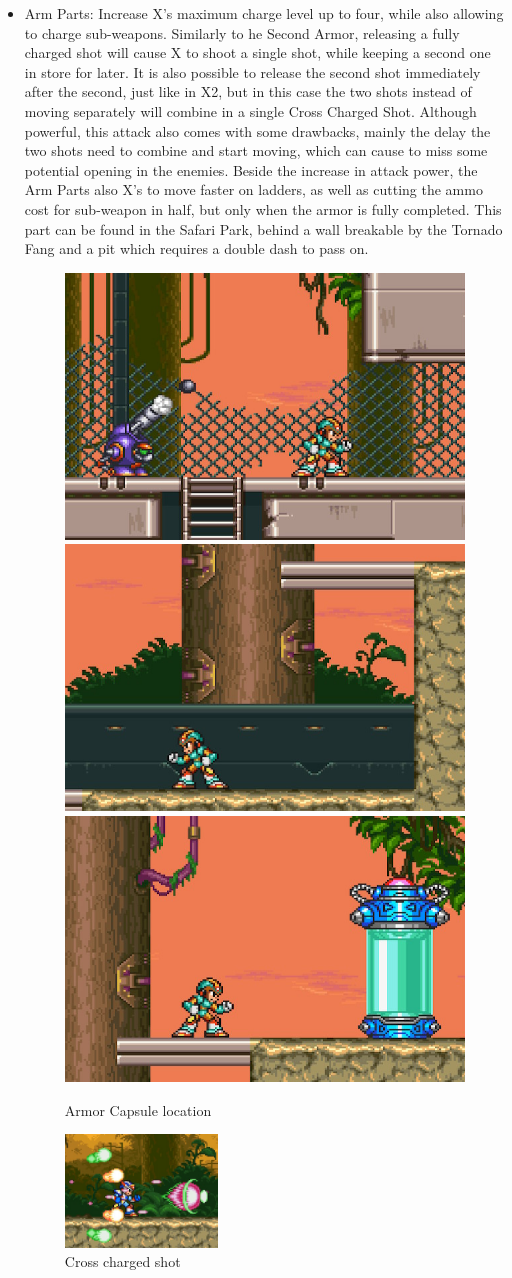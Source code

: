 \begin{itemize}
	\item Arm Parts: Increase X's maximum charge level up to four, while also allowing to charge sub-weapons. Similarly to he Second Armor, releasing a fully charged shot will cause X to shoot a single shot, while keeping a second one in store for later. It is also possible to release the second shot immediately after the second, just like in X2, but in this case the two shots instead of moving separately will combine in a single Cross Charged Shot. Although powerful, this attack also comes with some drawbacks, mainly the delay the two shots need to combine and start moving, which can cause to miss some potential opening in the enemies. 
	Beside the increase in attack power, the Arm Parts also X's to move faster on ladders, as well as cutting the ammo cost for sub-weapon in half, but only when the armor is fully completed. This part can be found in the Safari Park, behind a wall breakable by the Tornado Fang and a pit which requires a double dash to pass on.
	
	\begin{figure}[htp]
		\centering
		\includegraphics[width=.3\linewidth]{figures/X3/Neon_tiger/Armor_1.png}
		\includegraphics[width=.3\linewidth]{figures/X3/Neon_tiger/Armor_2.png}
		\includegraphics[width=.3\linewidth]{figures/X3/Neon_tiger/Armor_3.png}
		\caption{Armor Capsule location}
	\end{figure}
	
	\begin{figure}[htp]
		\centering
		\includegraphics[height=3cm]{figures/X3/weapons/Combo_shot.png}
		\caption{Cross charged shot}
	\end{figure}
	

\end{itemize}
